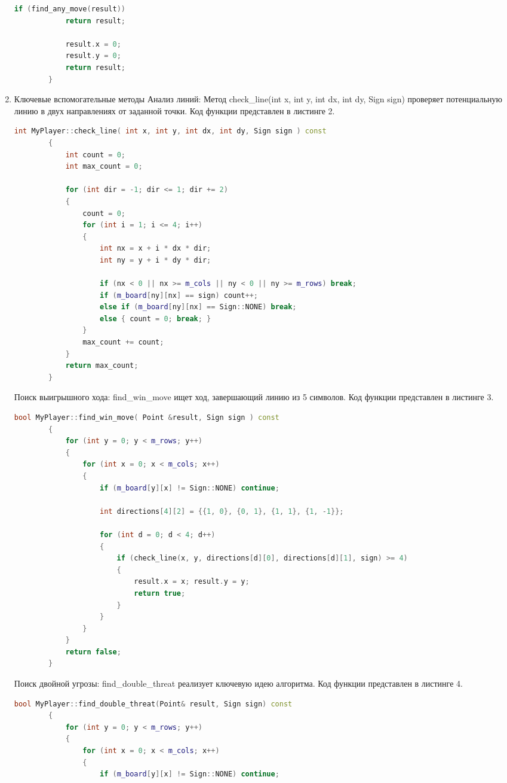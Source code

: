 \documentclass[a4paper]{article}
\begin{document}
\begin{enumerate}
\begin{lstlisting}[language=C++, caption={Функция выбора хода}]
			if (find_any_move(result))
			return result;
			
			result.x = 0;
			result.y = 0;
			return result;
		}
	\end{lstlisting}
	\item Ключевые вспомогательные методы
	Анализ линий: Метод check\_line(int x, int y, int dx, int dy, Sign sign) проверяет потенциальную линию в двух направлениях от заданной точки. Код функции представлен в листинге 2.
	
	\begin{lstlisting}[language=C++, caption={Функция анализа линий}]
		int MyPlayer::check_line( int x, int y, int dx, int dy, Sign sign ) const
		{
			int count = 0;
			int max_count = 0;
			
			for (int dir = -1; dir <= 1; dir += 2)
			{
				count = 0;
				for (int i = 1; i <= 4; i++)
				{
					int nx = x + i * dx * dir;
					int ny = y + i * dy * dir;
					
					if (nx < 0 || nx >= m_cols || ny < 0 || ny >= m_rows) break;
					if (m_board[ny][nx] == sign) count++;
					else if (m_board[ny][nx] == Sign::NONE) break;
					else { count = 0; break; }
				}
				max_count += count;
			}
			return max_count;
		}
	\end{lstlisting}
	
	Поиск выигрышного хода: find\_win\_move ищет ход, завершающий линию из 5 символов. Код функции представлен в листинге 3.
	
	\begin{lstlisting}[language=C++, caption={Функция поиска выигрышного кода}]
		bool MyPlayer::find_win_move( Point &result, Sign sign ) const
		{
			for (int y = 0; y < m_rows; y++)
			{
				for (int x = 0; x < m_cols; x++)
				{
					if (m_board[y][x] != Sign::NONE) continue;
					
					int directions[4][2] = {{1, 0}, {0, 1}, {1, 1}, {1, -1}};
					
					for (int d = 0; d < 4; d++)
					{
						if (check_line(x, y, directions[d][0], directions[d][1], sign) >= 4)
						{
							result.x = x; result.y = y;
							return true;
						}
					}
				}
			}
			return false;
		}
	\end{lstlisting}
	
	Поиск двойной угрозы: find\_double\_threat реализует ключевую идею алгоритма. Код функции представлен в листинге 4.
	
	\begin{lstlisting}[language=C++, caption={Функция поиска двойной угрозы}]
		bool MyPlayer::find_double_threat(Point& result, Sign sign) const
		{
			for (int y = 0; y < m_rows; y++)
			{
				for (int x = 0; x < m_cols; x++)
				{
					if (m_board[y][x] != Sign::NONE) continue;
					

\end{lstlisting}
\end{enumerate}
\end{document}
